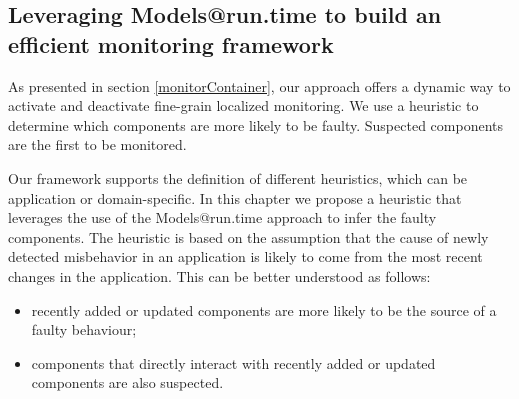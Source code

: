 

\subsection{Leveraging Models@run.time to build an efficient monitoring framework}\label{sec:heuristic-based-on-modeling}
As presented in section \ref{monitorContainer}, our approach offers a dynamic way to activate and deactivate fine-grain localized monitoring.
We use a heuristic to determine which components are more likely to be faulty.
Suspected components are the first to be monitored.


Our framework supports the definition of different heuristics, which can be application or domain-specific.
In this chapter we propose a heuristic that leverages the use of the Models@run.time approach to infer the faulty components.
The heuristic is based on the assumption that the cause of newly detected misbehavior in an application is likely to come from the most recent changes in the application.
This can be better understood as follows:
\begin{itemize}
\leftskip -.2in
  \item recently added or updated components are more likely to be the source of a faulty behaviour;
  \item components that directly interact with recently added or updated components are also suspected.
\end{itemize}

